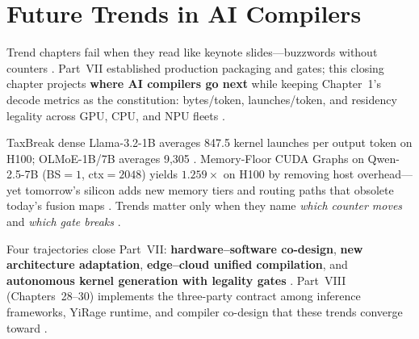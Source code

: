 \chapter{Future Trends in AI Compilers}
\label{chap:ch27}

Trend chapters fail when they read like keynote slides---buzzwords without counters \citep{patel2025llminference,taxbreak2026,memoryfloor2026,dlbook}. Part~VII established production packaging and gates; this closing chapter projects \textbf{where AI compilers go next} while keeping Chapter~1's decode metrics as the constitution: bytes/token, launches/token, and residency legality across GPU, CPU, and NPU fleets \citep{chen2020compilerbasedhardw,yirage2026,amd2024xdna,amd2024aie,kwon2023vllm,liu2024deepseekv3,semianalysis2024tma,dao2022flashattention,dao2023flashdecoding,nvidia2024cudagraphs,nvidia2022hopper}.

TaxBreak dense Llama-3.2-1B averages 847.5 kernel launches per output token on H100; OLMoE-1B/7B averages 9,305 \citep{taxbreak2026}. Memory-Floor CUDA Graphs on Qwen-2.5-7B (BS${=}1$, ctx${=}2048$) yields $1.259\times$ on H100 by removing host overhead---yet tomorrow's silicon adds new memory tiers and routing paths that obsolete today's fusion maps \citep{memoryfloor2026,nvidia2024cudagraphs,semianalysis2024tma,amd2024xdna,amd2024aie}. Trends matter only when they name \emph{which counter moves} and \emph{which gate breaks} \citep{patel2025llminference,yirage2026,chen2020compilerbasedhardw,kwon2023vllm,liu2024deepseekv3,memoryfloor2026,taxbreak2026,dlbook,dao2022flashattention,dao2023flashdecoding,nvidia2024cudagraphs,nvidia2022hopper}.

Four trajectories close Part~VII: \textbf{hardware--software co-design}, \textbf{new architecture adaptation}, \textbf{edge--cloud unified compilation}, and \textbf{autonomous kernel generation with legality gates} \citep{chen2020compilerbasedhardw,yirage2026,amd2024xdna,amd2024aie,patel2025llminference,kwon2023vllm,liu2024deepseekv3,memoryfloor2026,taxbreak2026,semianalysis2024tma,dao2022flashattention,dao2023flashdecoding,nvidia2024cudagraphs,nvidia2022hopper,dlbook}. Part~VIII (Chapters~28--30) implements the three-party contract among inference frameworks, YiRage runtime, and compiler co-design that these trends converge toward \citep{yirage2026,kwon2023vllm,patel2025llminference,chen2020compilerbasedhardw,liu2024deepseekv3,memoryfloor2026,taxbreak2026,amd2024aie,dlbook,semianalysis2024tma,amd2024xdna,dao2022flashattention,dao2023flashdecoding,nvidia2024cudagraphs,nvidia2022hopper}.

